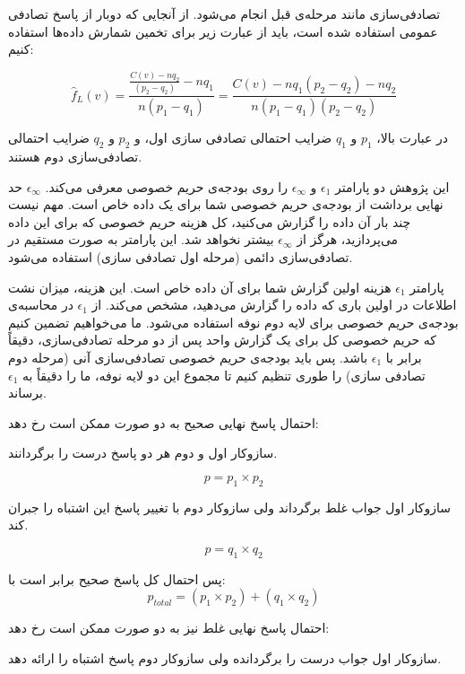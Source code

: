 تصادفی‌سازی مانند مرحله‌ی قبل انجام می‌شود. از آنجایی که دوبار از پاسخ تصادفی عمومی استفاده شده است، باید از عبارت زیر برای تخمین شمارش داده‌ها استفاده کنیم:

\begin{equation}
\hat{f}_L(v) = \frac{\frac{C(v) - nq_2}{(p_2 - q_2)} - nq_1}{n(p_1 - q_1)} = \frac{C(v) - nq_1(p_2 - q_2) - nq_2}{n(p_1 - q_1)(p_2 - q_2)}
\label{equ:estimateFrequency}
\end{equation}

در عبارت بالا، $p_1$ و $q_1$ ضرایب احتمالی تصادفی سازی اول، و $p_2$ و $q_2$ ضرایب احتمالی تصادفی‌سازی دوم هستند.


این پژوهش دو پارامتر $\epsilon_1$ و $\epsilon_\infty$ را روی بودجه‌ی حریم خصوصی معرفی می‌کند. $\epsilon_\infty$ حد نهایی برداشت از بودجه‌ی حریم خصوصی شما برای یک داده خاص است. مهم نیست چند بار آن داده‌ را گزارش می‌کنید، کل هزینه حریم خصوصی که برای این داده می‌پردازید، هرگز از $\epsilon_\infty$  بیشتر نخواهد شد. این پارامتر به صورت مستقیم در تصادفی‌سازی دائمی (مرحله اول تصادفی سازی) استفاده می‌شود.

پارامتر $\epsilon_1$ هزینه اولین گزارش شما برای آن داده خاص است. این هزینه، میزان نشت اطلاعات در اولین باری که داده‌ را گزارش می‌دهید، مشخص می‌کند. از $\epsilon_1$ در محاسبه‌ی بودجه‌ی حریم خصوصی برای لایه دوم نوفه استفاده می‌شود. ما می‌خواهیم تضمین کنیم که حریم خصوصی کل برای یک گزارش واحد پس از دو مرحله تصادفی‌سازی، دقیقاً برابر با $\epsilon_1$ باشد.  پس باید بودجه‌ی حریم خصوصی تصادفی‌سازی آنی (مرحله دوم تصادفی سازی) را طوری تنظیم کنیم تا مجموع این دو لایه نوفه، ما را دقیقاً به $\epsilon_1$ برساند.


احتمال پاسخ نهایی صحیح به دو صورت ممکن است رخ دهد:


 سازوکار اول و دوم هر دو پاسخ درست را برگردانند.

$$p = p_1 \times p_2$$

 سازوکار اول جواب غلط برگرداند ولی سازوکار دوم با تغییر پاسخ این اشتباه را جبران کند.

$$p = q_1 \times q_2$$

پس احتمال کل پاسخ صحیح برابر است با:
$$p_{total} = (p_1 \times p_2) + (q_1 \times q_2)$$

احتمال پاسخ نهایی غلط نیز به دو صورت ممکن است رخ دهد:


 سازوکار اول جواب درست را برگردانده ولی سازوکار دوم پاسخ اشتباه را ارائه دهد.

